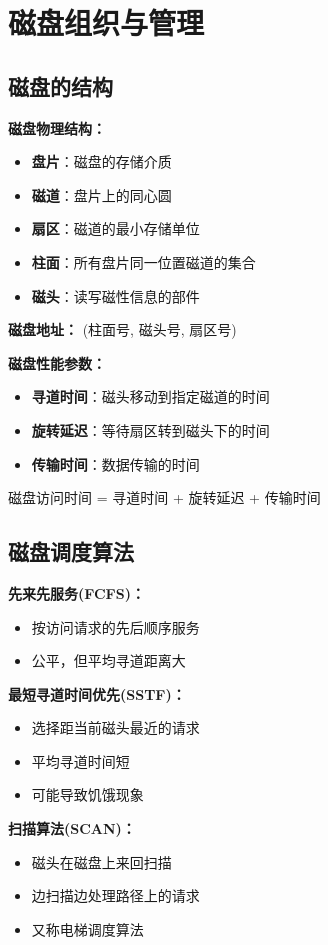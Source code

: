 \documentclass[lang=cn,newtx,10pt,scheme=chinese]{../../elegantbook}
\begin{document}
\section{磁盘组织与管理}

\subsection{磁盘的结构}

\textbf{磁盘物理结构：}
\begin{itemize}
  \item \textbf{盘片}：磁盘的存储介质
  \item \textbf{磁道}：盘片上的同心圆
  \item \textbf{扇区}：磁道的最小存储单位
  \item \textbf{柱面}：所有盘片同一位置磁道的集合
  \item \textbf{磁头}：读写磁性信息的部件
\end{itemize}

\textbf{磁盘地址：}
(柱面号, 磁头号, 扇区号)

\textbf{磁盘性能参数：}
\begin{itemize}
  \item \textbf{寻道时间}：磁头移动到指定磁道的时间
  \item \textbf{旋转延迟}：等待扇区转到磁头下的时间
  \item \textbf{传输时间}：数据传输的时间
\end{itemize}

磁盘访问时间 = 寻道时间 + 旋转延迟 + 传输时间

\subsection{磁盘调度算法}

\textbf{先来先服务(FCFS)：}
\begin{itemize}
  \item 按访问请求的先后顺序服务
  \item 公平，但平均寻道距离大
\end{itemize}

\textbf{最短寻道时间优先(SSTF)：}
\begin{itemize}
  \item 选择距当前磁头最近的请求
  \item 平均寻道时间短
  \item 可能导致饥饿现象
\end{itemize}

\textbf{扫描算法(SCAN)：}
\begin{itemize}
  \item 磁头在磁盘上来回扫描
  \item 边扫描边处理路径上的请求
  \item 又称电梯调度算法
\end{itemize}
\end{document}
